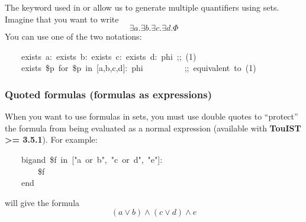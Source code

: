 \noindent The keyword  used in  or  allow us to generate
multiple quantifiers using sets. Imagine that you want to write%
\noindent\noindent\[\exists a. \exists b. \exists c. \exists d. \Phi
\]%
\noindent You can use one of the two notations:
\begin{mdpre}%
\noindent~~~~{exists}~a:~{exists}~b:~{exists}~c:~{exists}~d:~phi~{;;~(1)}\\
~~~~{exists}~{\$p}~{for}~{\$p}~{in}~{}[a,b,c,d]:~phi~~~~~~~~~~{;;~equivalent~to~(1)}%
\end{mdpre}
\subsubsection{Quoted formulas (formulas as expressions)}\label{quoted-formulas}%

\noindent When you want to use formulas in sets, you must use double quotes 
to \textquotedblleft{}protect\textquotedblright{} the formula from being evaluated as a normal expression
(available with \textbf{TouIST \textgreater{}= 3.5.1}). For example:%
\begin{mdpre}%
\noindent~~~~{bigand}~{\$f}~{in}~{}["a~or~b",~"c~or~d",~"e"]:\\
~~~~~~~~{\$f}\\
~~~~{end}%
\end{mdpre}\noindent will give the formula
\noindent\noindent\[(a \vee b) \wedge (c \vee d) \wedge e
\]%

